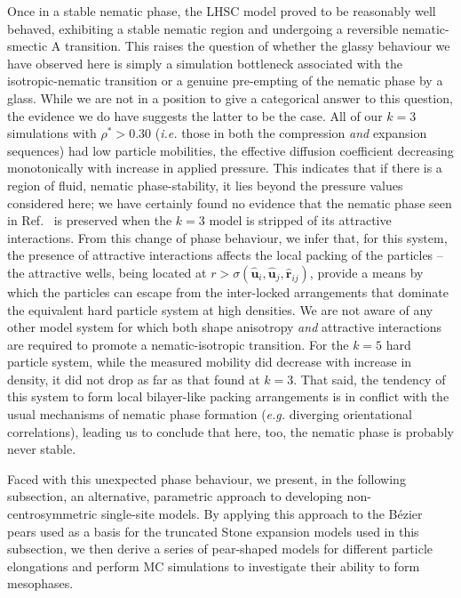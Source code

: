 \documentclass[%
reprint,
superscriptaddress,
showpacs,
 amsmath,amssymb,
 aps,
floatfix,
]{revtex4-1}
\newcommand{\vecth}[1]{ \mathbf{\hat{#1} } }
\newcommand{\rij}{\vecth{r}_{ij}}
\newcommand{\ui}{\vecth{u}_i}
\newcommand{\uj}{\vecth{u}_j}
\newcommand{\sijr}{\sigma(\ui,\uj,\rij)}
\begin{document}
Once in a stable nematic phase, the LHSC model proved to be reasonably well behaved,
exhibiting a stable nematic region and undergoing a reversible nematic-smectic A
transition. This raises the question of whether the glassy behaviour we have observed here is
simply a simulation bottleneck associated with the isotropic-nematic transition or a genuine
pre-empting of the nematic phase by a glass. While we are not in a position to give a
categorical answer to this question, the evidence we do have suggests the latter to be the case.
All of our $k=3$ simulations with $\rho^{*} > 0.30$ ({\em i.e.} those in both the compression
{\em and} expansion sequences) had low particle mobilities, the effective diffusion coefficient
decreasing monotonically with increase in applied pressure. This indicates that if there is
a region of fluid, nematic phase-stability, it lies beyond the pressure values considered here;
we have certainly found no evidence that the nematic phase seen in Ref.~\cite{Berardi_Ricci_01}
is preserved when the $k=3$ model is stripped of its attractive interactions. From this change
of phase behaviour, we infer that, for this system, the presence of attractive interactions
affects the local packing of the particles -- the attractive wells, being located at $r> \sijr$,
provide a means by which the particles can escape from the inter-locked arrangements that
dominate the equivalent hard particle system at high densities. We are not aware of any other
model system for which both shape anisotropy \emph{and} attractive interactions are required to
promote a nematic-isotropic transition. For the $k=5$ hard particle system, while the measured
mobility did decrease with increase in density, it did not drop as far as that found at $k=3$.
That said, the tendency of this system to form local bilayer-like packing arrangements is in
conflict with the usual mechanisms of nematic phase formation ({\em e.g.} diverging
orientational correlations), leading us to conclude that here, too, the nematic phase is
probably never stable.

Faced with this unexpected phase behaviour, we present, in the following subsection, an
alternative, parametric approach to developing non-centrosymmetric single-site models. By
applying this approach to the B\'{e}zier pears used as a basis for the truncated Stone expansion models
used in this subsection, we then derive a series of pear-shaped models for different particle
elongations and perform MC simulations to investigate their ability to form mesophases.

\end{document}
